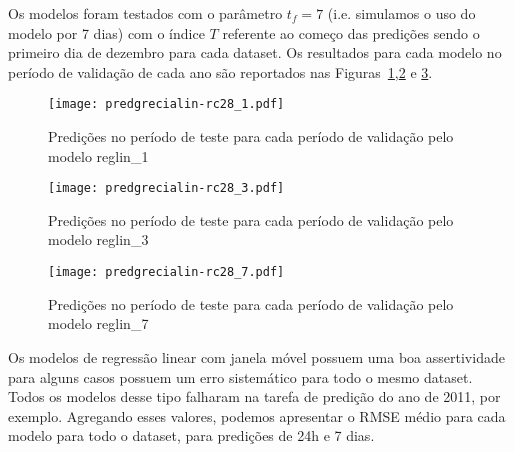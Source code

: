 Os modelos foram testados com o parâmetro $t_f = 7$ (i.e. simulamos o uso do
modelo por 7 dias) com o índice $T$ referente
ao começo das predições sendo o primeiro dia de dezembro para cada dataset.
Os resultados para cada modelo no período de validação de cada ano são
reportados nas Figuras~\ref{fig:rc281preds},\ref{fig:rc283preds} e
\ref{fig:rc287preds}.  

\begin{figure}[H]
  \centering
  \texttt{[image: predgrecialin-rc28\_1.pdf]}
  \caption{Predições no período de teste para cada período de validação pelo
    modelo reglin\_1}
  \label{fig:rc281preds}
\end{figure}

\begin{figure}[H]
  \centering
  \texttt{[image: predgrecialin-rc28\_3.pdf]}
  \caption{Predições no período de teste para cada período de validação pelo
    modelo reglin\_3}
  \label{fig:rc283preds}

\end{figure}
\begin{figure}[H]
  \centering
  \texttt{[image: predgrecialin-rc28\_7.pdf]}
  \caption{Predições no período de teste para cada período de validação pelo
    modelo reglin\_7}
  \label{fig:rc287preds}

\end{figure}

Os modelos de regressão linear com janela móvel possuem uma boa assertividade
para alguns casos possuem um erro sistemático para todo o mesmo dataset. Todos
os modelos desse tipo falharam na tarefa de predição do ano de 2011, por exemplo.
Agregando esses valores, podemos apresentar o RMSE médio para cada modelo para
todo o dataset, para predições de 24h e 7 dias.

